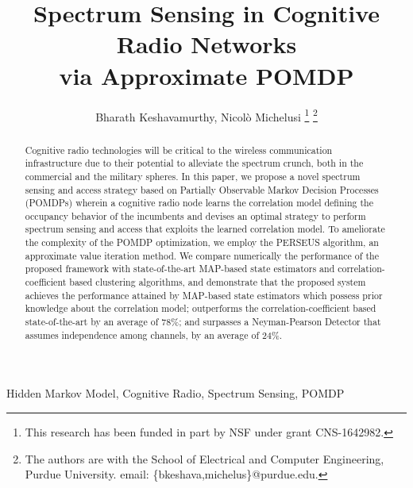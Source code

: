 \documentclass[10pt,twocolumn]{IEEEtran}
\title{Spectrum Sensing in Cognitive Radio Networks
\\
via Approximate POMDP}
\author{Bharath Keshavamurthy, Nicol\`{o} Michelusi
\thanks{This research has been funded in part by NSF under grant CNS-1642982.}
\thanks{The authors are with the School of Electrical and Computer Engineering, Purdue University. email: \{bkeshava,michelus\}@purdue.edu.}
\vspace{-5mm}}
\begin{document}
 
\maketitle
{}
\begin{abstract}
Cognitive radio technologies will be critical to the wireless communication infrastructure due to their potential to alleviate the spectrum crunch, both in the commercial and the military spheres. In this paper, we propose a novel spectrum sensing and access strategy based on Partially Observable Markov Decision Processes (POMDPs) wherein a cognitive radio node learns the correlation model defining the occupancy behavior of the incumbents and devises an optimal strategy to perform spectrum sensing and access that exploits the learned correlation model.
To ameliorate the complexity of the POMDP optimization, we employ the PERSEUS algorithm, an approximate value iteration method. We compare numerically the performance of the proposed framework with state-of-the-art MAP-based state estimators and correlation-coefficient based clustering algorithms, and demonstrate that the proposed system achieves the performance attained by MAP-based state estimators which possess prior knowledge about the correlation model; outperforms the correlation-coefficient based state-of-the-art by an average of 78\%; and surpasses a Neyman-Pearson Detector that assumes independence among channels, by an average of 24\%.
\end{abstract}
\begin{IEEEkeywords}
Hidden Markov Model, Cognitive Radio, Spectrum Sensing, POMDP
\end{IEEEkeywords}
\end{document}
